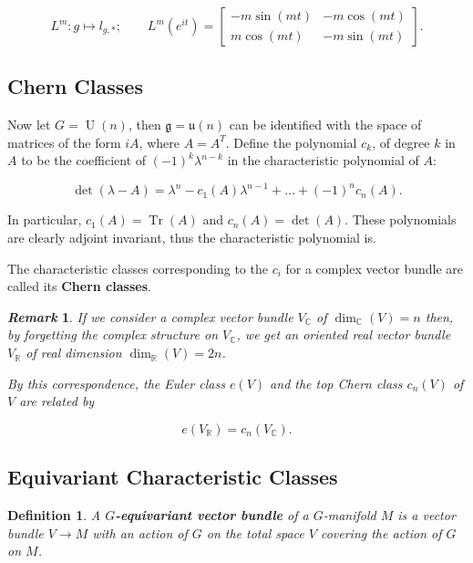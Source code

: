 \documentclass{article}
\newtheorem{defn}[theorem]{Definition\rm}
\newtheorem{remark}{\it Remark\/}
\newcommand{\ra}{\rightarrow}
\newcommand{\RR}{\mathbb{R}}
\newcommand{\CC}{\mathbb{C}}
\newcommand{\mfg}{\mathfrak{g}}
\newcommand{\mf}[1]{\mathfrak{#1}}
\DeclareMathOperator{\Tr}{Tr}
\DeclareMathOperator{\UU}{U}
\begin{document}
\begin{equation*}
	L^{m} : g \longmapsto l_{g,\ast}; \qquad
	L^{m}(e^{it}) =
	\begin{bmatrix}
		-m\sin(mt) & -m\cos(mt) \\
		m\cos(mt) & -m\sin(mt)
	\end{bmatrix}.
\end{equation*}

\subsection{Chern Classes}

Now let $G = \UU(n)$, then $\mfg = \mf{u}(n)$ can be identified with the space of matrices of the form $iA$, where $A = A^{T}$. Define the polynomial $c_{k}$, of degree $k$ in $A$ to be the coefficient of $(-1)^{k}\lambda^{n-k}$ in the characteristic polynomial of $A$:

\begin{equation*}
	\det(\lambda - A) = \lambda^{n} - c_{1}(A)\lambda^{n-1} + \ldots + (-1)^{n}c_{n}(A).
\end{equation*}

In particular, $c_{1}(A) = \Tr(A)$ and $c_{n}(A) = \det(A)$. These polynomials are clearly adjoint invariant, thus the characteristic polynomial is.

The characteristic classes corresponding to the $c_{i}$ for a complex vector bundle are called its \textbf{Chern classes}.

\begin{remark}
	If we consider a complex vector bundle $V_{\CC}$ of $\dim_{\CC}(V) = n$ then, by forgetting the complex structure on $V_{\CC}$, we get an oriented real vector bundle $V_{\RR}$ of real dimension $\dim_{\RR}(V) = 2n$.
	
	By this correspondence, the Euler class $e(V)$ and the top Chern class $c_{n}(V)$ of $V$ are related by
	
	\begin{equation*}
		e(V_{\RR}) = c_{n}(V_{\CC}).
	\end{equation*}
	
\end{remark}

\subsection{Equivariant Characteristic Classes}

\begin{defn}
	A $G$\textbf{-equivariant vector bundle} of a $G$-manifold $M$ is a vector bundle $V \ra M$ with an action of $G$ on the total space $V$ covering the action of $G$ on $M$.
\end{defn}
\end{document}
